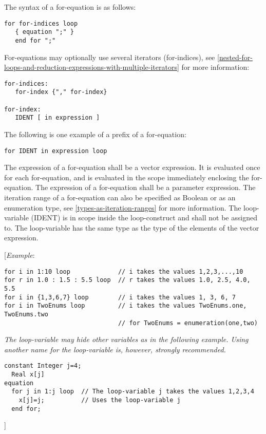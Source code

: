 The syntax of a for-equation is as follows:
\begin{lstlisting}[language=grammar]
for for-indices loop
   { equation ";" } 
   end for ";" 
\end{lstlisting}

For-equations may optionally use several iterators (for-indices), see
\autoref{nested-for-loops-and-reduction-expressions-with-multiple-iterators} for more information:
\begin{lstlisting}[language=grammar]
for-indices:    
   for-index {"," for-index} 
 
for-index:    
   IDENT [ in expression ] 
\end{lstlisting}

The following is one example of a prefix of a for-equation:
\begin{lstlisting}[language=grammar]
for IDENT in expression loop
\end{lstlisting}

The expression of a for-equation shall be a vector expression. It is
evaluated once for each for-equation, and is evaluated in the scope
immediately enclosing the for-equation. The expression of a for-equation
shall be a parameter expression. The iteration range of a for-equation
can also be specified as Boolean or as an enumeration type, see 
\autoref{types-as-iteration-ranges} for more information. The loop-variable (IDENT) is in scope
inside the loop-construct and shall not be assigned to. The
loop-variable has the same type as the type of the elements of the
vector expression.

{[}\emph{Example}:
\begin{lstlisting}[language=modelica]
for i in 1:10 loop             // i takes the values 1,2,3,...,10 
for r in 1.0 : 1.5 : 5.5 loop  // r takes the values 1.0, 2.5, 4.0, 5.5 
for i in {1,3,6,7} loop        // i takes the values 1, 3, 6, 7 
for i in TwoEnums loop         // i takes the values TwoEnums.one, TwoEnums.two                                
                               // for TwoEnums = enumeration(one,two)
\end{lstlisting}

\emph{The loop-variable may hide other variables as in the following
example. Using another name for the loop-variable is, however, strongly
recommended.}

\begin{lstlisting}[language=modelica]
  constant Integer j=4;
  Real x[j]
equation   
  for j in 1:j loop  // The loop-variable j takes the values 1,2,3,4     
    x[j]=j;          // Uses the loop-variable j   
  end for;
\end{lstlisting}
{]}

